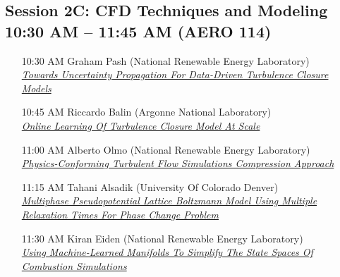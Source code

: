 \subsection*{Session 2C: CFD Techniques and Modeling \\ 10:30 AM  -- 11:45 AM (AERO 114)}
\begin{enumerate}
\item [10:30 AM] Graham Pash (National Renewable Energy Laboratory) \\ \hyperlink{GrahamPash}{\it Towards Uncertainty Propagation For Data-Driven Turbulence Closure Models }
\item [10:45 AM] Riccardo Balin (Argonne National Laboratory) \\ \hyperlink{RiccardoBalin}{\it Online Learning Of Turbulence Closure Model At Scale }
\item [11:00 AM] Alberto Olmo  (National Renewable Energy Laboratory) \\ \hyperlink{AlbertoOlmo }{\it Physics-Conforming Turbulent Flow Simulations Compression Approach }
\item [11:15 AM] Tahani Alsadik (University Of Colorado Denver) \\ \hyperlink{TahaniAlsadik}{\it Multiphase Pseudopotential Lattice Boltzmann Model Using Multiple Relaxation Times For Phase Change Problem }
\item [11:30 AM] Kiran Eiden (National Renewable Energy Laboratory) \\ \hyperlink{KiranEiden}{\it Using Machine-Learned Manifolds To Simplify The State Spaces Of Combustion Simulations }
\end{enumerate}
